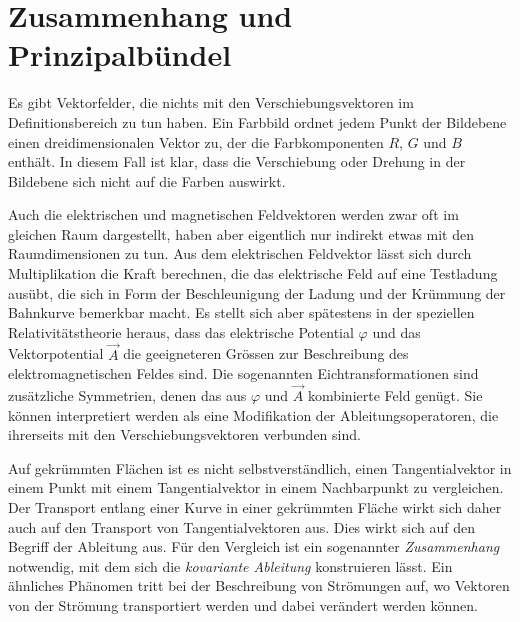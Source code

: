%
%
%

%
%
\section{Zusammenhang und Prinzipalbündel
\label{buch:fallstudie:prinzipalbuendel}}
Es gibt Vektorfelder, die nichts mit den Verschiebungsvektoren im
Definitionsbereich zu tun haben.
Ein Farbbild ordnet jedem Punkt der Bildebene einen dreidimensionalen
Vektor zu, der die Farbkomponenten $R$, $G$ und $B$ enthält.
In diesem Fall ist klar, dass die Verschiebung oder Drehung in der
Bildebene sich nicht auf die Farben auswirkt.

Auch die elektrischen und magnetischen Feldvektoren werden zwar
%
%
oft im gleichen Raum dargestellt, haben aber eigentlich nur indirekt
etwas mit den Raumdimensionen zu tun.
Aus dem elektrischen Feldvektor lässt sich durch Multiplikation die
Kraft berechnen, die das elektrische Feld auf eine Testladung ausübt,
die sich in Form der Beschleunigung der Ladung und der Krümmung der
Bahnkurve bemerkbar macht.
Es stellt sich aber spätestens in der speziellen Relativitätstheorie
heraus, dass das elektrische Potential $\varphi$ und das Vektorpotential
$\vec{A}$ die geeigneteren Grössen zur Beschreibung des elektromagnetischen
Feldes sind.
Die sogenannten Eichtransformationen sind zusätzliche Symmetrien, denen
%
das aus $\varphi$ und $\vec{A}$ kombinierte Feld genügt.
Sie können interpretiert werden als eine Modifikation der
Ableitungsoperatoren, die ihrerseits mit den Verschiebungsvektoren
verbunden sind.

Auf gekrümmten Flächen ist es nicht selbstverständlich, einen
Tangentialvektor in einem Punkt mit einem Tangentialvektor in einem
Nachbarpunkt zu vergleichen.
Der Transport entlang einer Kurve in einer gekrümmten Fläche wirkt
sich daher auch auf den Transport von Tangentialvektoren aus.
Dies wirkt sich auf den Begriff der Ableitung aus.
Für den Vergleich ist ein sogenannter {\em Zusammenhang} notwendig, mit
dem sich die {\em kovariante Ableitung} konstruieren lässt.
%
%
Ein ähnliches Phänomen tritt bei der Beschreibung von Strömungen
auf, wo Vektoren von der Strömung transportiert werden und dabei
verändert werden können.

%

